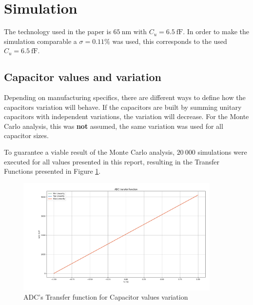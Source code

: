 \section{Simulation}
\label{sec:simulation}

The technology used in the paper is $\SI{65}{\nano\meter}$ with $C_u = \SI{6.5}{\femto\farad}$. In order to make the simulation comparable a $\sigma = 0.11\%$ was used, this corresponds to the used $C_u = \SI{6.5}{\femto\farad}$.


\subsection{Capacitor values and variation}

Depending on manufacturing specifics, there are different ways to define how the capacitors variation will behave. If the capacitors are built by summing unitary capacitors with independent variations, the variation will decrease. For the Monte Carlo analysis, this was \textbf{not} assumed, the same variation was used for all capacitor sizes.

To guarantee a viable result of the Monte Carlo analysis, $20~000$ simulations were executed for all values presented in this report, resulting in the Transfer Functions presented in Figure \ref{fig:ADC_TF_ALLCAPS}.

\begin{figure}[H]

    \centering
    \includegraphics*[width=0.9\textwidth]{Images/ADC_TransFunc_All_Caps_20Ksim_s0011.png}
    \caption{ADC's Transfer function for Capacitor values variation}

    \label{fig:ADC_TF_ALLCAPS}
\end{figure}

